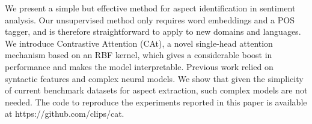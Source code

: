 We present  a  simple  but  effective  method for aspect identification in sentiment analysis. Our unsupervised method only requires word embeddings  and  a  POS  tagger,  and  is  therefore straightforward to apply to new domains and languages.  We introduce Contrastive Attention (CAt), a novel single-head attention mechanism  based  on  an  RBF  kernel,  which gives a considerable boost in performance and makes the model interpretable. Previous work relied on syntactic features and complex neural  models. We  show  that  given  the  simplicity  of  current  benchmark  datasets  for  aspect extraction, such complex models are not needed.    The  code  to  reproduce  the  experiments  reported  in  this  paper  is  available  at https://github.com/clips/cat.
